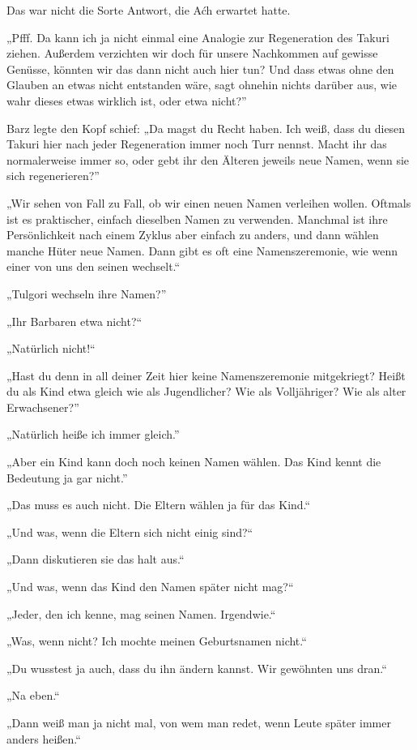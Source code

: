 Das war nicht die Sorte Antwort, die Aćh erwartet hatte.

„Pfff. Da kann ich ja nicht einmal eine Analogie zur Regeneration des Takuri ziehen. Außerdem verzichten wir doch für unsere Nachkommen auf gewisse Genüsse, könnten wir das dann nicht auch hier tun? Und dass etwas ohne den Glauben an etwas nicht entstanden wäre, sagt ohnehin nichts darüber aus, wie wahr dieses etwas wirklich ist, oder etwa nicht?”

Barz legte den Kopf schief: „Da magst du Recht haben. Ich weiß, dass du diesen Takuri hier nach jeder Regeneration immer noch Turr nennst. Macht ihr das normalerweise immer so, oder gebt ihr den Älteren jeweils neue Namen, wenn sie sich regenerieren?”

„Wir sehen von Fall zu Fall, ob wir einen neuen Namen verleihen wollen. Oftmals ist es praktischer, einfach dieselben Namen zu verwenden. Manchmal ist ihre Persönlichkeit nach einem Zyklus aber einfach zu anders, und dann wählen manche Hüter neue Namen. Dann gibt es oft eine Namenszeremonie, wie wenn einer von uns den seinen wechselt.“

„Tulgori wechseln ihre Namen?”

„Ihr Barbaren etwa nicht?“

„Natürlich nicht!“

„Hast du denn in all deiner Zeit hier keine Namenszeremonie mitgekriegt? Heißt du als Kind etwa gleich wie als Jugendlicher? Wie als Volljähriger? Wie als alter Erwachsener?”

„Natürlich heiße ich immer gleich.”

„Aber ein Kind kann doch noch keinen Namen wählen. Das Kind kennt die Bedeutung ja gar nicht.”

„Das muss es auch nicht. Die Eltern wählen ja für das Kind.“

„Und was, wenn die Eltern sich nicht einig sind?“

„Dann diskutieren sie das halt aus.“

„Und was, wenn das Kind den Namen später nicht mag?“

„Jeder, den ich kenne, mag seinen Namen. Irgendwie.“

„Was, wenn nicht? Ich mochte meinen Geburtsnamen nicht.“

„Du wusstest ja auch, dass du ihn ändern kannst. Wir gewöhnten uns dran.“

„Na eben.“

„Dann weiß man ja nicht mal, von wem man redet, wenn Leute später immer anders heißen.“

